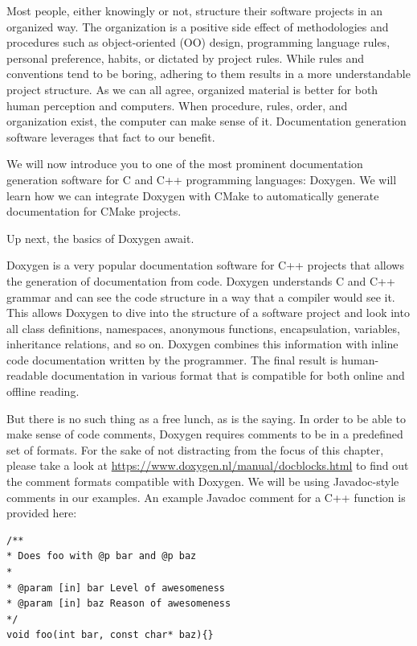 
Most people, either knowingly or not, structure their software projects in an organized way. The organization is a positive side effect of methodologies and procedures such as object-oriented (OO) design, programming language rules, personal preference, habits, or dictated by project rules. While rules and conventions tend to be boring, adhering to them results in a more understandable project structure. As we can all agree, organized material is better for both human perception and computers. When procedure, rules, order, and organization exist, the computer can make sense of it. Documentation generation software leverages that fact to our benefit.

We will now introduce you to one of the most prominent documentation generation software for C and C++ programming languages: Doxygen. We will learn how we can integrate Doxygen with CMake to automatically generate documentation for CMake projects. 

Up next, the basics of Doxygen await.


Doxygen is a very popular documentation software for C++ projects that allows the generation of documentation from code. Doxygen understands C and C++ grammar and can see the code structure in a way that a compiler would see it. This allows Doxygen to dive into the structure of a software project and look into all class definitions, namespaces, anonymous functions, encapsulation, variables, inheritance relations, and so on. Doxygen combines this information with inline code documentation written by the programmer. The final result is human-readable documentation in various format that is compatible for both online and offline reading. 

But there is no such thing as a free lunch, as is the saying. In order to be able to make sense of code comments, Doxygen requires comments to be in a predefined set of formats. For the sake of not distracting from the focus of this chapter, please take a look at \url{https://www.doxygen.nl/manual/docblocks.html} to find out the comment formats compatible with Doxygen. We will be using Javadoc-style comments in our examples. An example Javadoc comment for a C++ function is provided here:

\begin{lstlisting}[style=styleCXX]
/**
* Does foo with @p bar and @p baz
*
* @param [in] bar Level of awesomeness
* @param [in] baz Reason of awesomeness
*/
void foo(int bar, const char* baz){}
\end{lstlisting}

